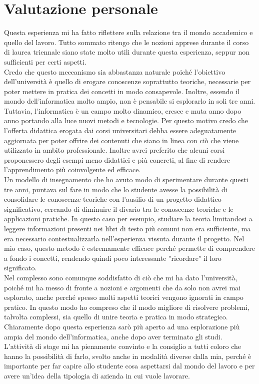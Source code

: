 \section{Valutazione personale}
Questa esperienza mi ha fatto riflettere sulla relazione tra il mondo accademico e quello del lavoro. Tutto sommato ritengo che le nozioni apprese durante il corso di laurea triennale siano state molto utili durante questa esperienza, seppur non sufficienti per certi aspetti. \\
Credo che questo meccanismo sia abbastanza naturale poiché l'obiettivo dell'università è quello di erogare conoscenze soprattutto teoriche, necessarie per poter mettere in pratica dei concetti in modo consapevole. Inoltre, essendo il mondo dell'informatica molto ampio, non è pensabile si esplorarlo in soli tre anni. \\
Tuttavia, l'informatica è un campo molto dinamico, cresce e muta anno dopo anno portando alla luce nuovi metodi e tecnologie. Per questo motivo credo che l'offerta didattica erogata dai corsi universitari debba essere adeguatamente aggiornata per poter offrire dei contenuti che siano in linea con ciò che viene utilizzato in ambito professionale. %
Inoltre avrei preferito che alcuni corsi proponessero degli esempi meno didattici e più concreti, al fine di rendere l'apprendimento più coinvolgente ed efficace. \\
Un modello di insegnamento che ho avuto modo di sperimentare durante questi tre anni, puntava sul fare in modo che lo studente avesse la possibilità di consolidare le conoscenze teoriche con l'ausilio di un progetto didattico significativo, cercando di diminuire il divario tra le conoscenze teoriche e le applicazioni pratiche. In questo caso per esempio, studiare la teoria limitandosi a leggere informazioni presenti nei libri di testo più comuni non era sufficiente, ma era necessario contestualizzarla nell'esperienza vissuta durante il progetto. Nel mio caso, questo metodo è estremamente efficace perché permette di comprendere a fondo i concetti, rendendo quindi poco interessante "ricordare" il loro significato. \\
Nel complesso sono comunque soddisfatto di ciò che mi ha dato l'università, poiché mi ha messo di fronte a nozioni e argomenti che da solo non avrei mai esplorato, anche perché spesso molti aspetti teorici vengono ignorati in campo pratico. In questo modo ho compreso che il modo migliore di risolvere problemi, talvolta complessi, sia quello di unire teoria e pratica in modo strategico. Chiaramente dopo questa esperienza sarò più aperto ad una esplorazione più ampia del mondo dell'informatica, anche dopo aver terminato gli studi. \\
L'attività di stage mi ha pienamente convinto e la consiglio a tutti coloro che hanno la possibilità di farlo, svolto anche in modalità diverse dalla mia, perché è importante per far capire allo studente cosa aspettarsi dal mondo del lavoro e per avere un'idea della tipologia di azienda in cui vuole lavorare.
